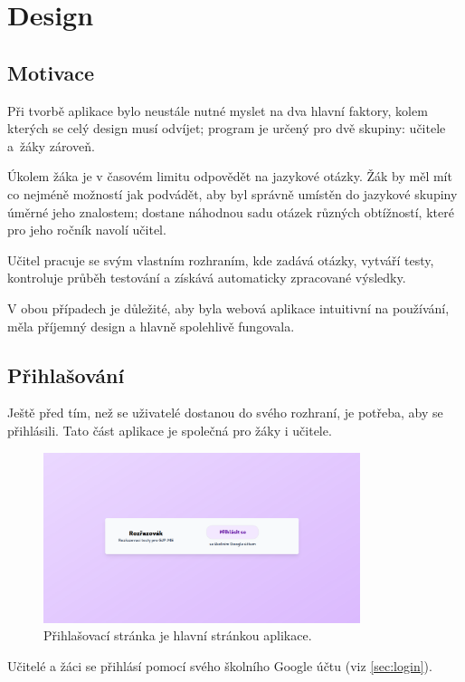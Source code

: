 \hypertarget{Design}{\chapter{Design}}

\section{Motivace}

Při tvorbě aplikace bylo neustále nutné myslet na dva hlavní faktory, kolem kterých se celý design musí odvíjet; program je určený pro dvě skupiny: učitele a~žáky zároveň. 

Úkolem žáka je v časovém limitu odpovědět na jazykové otázky. Žák by měl mít co nejméně možností jak podvádět, aby byl správně umístěn do jazykové skupiny úměrné jeho znalostem; dostane náhodnou sadu otázek různých obtížností, které pro jeho ročník navolí učitel.

Učitel pracuje se svým vlastním rozhraním, kde zadává otázky, vytváří testy, \mbox{kontroluje} průběh testování a získává automaticky zpracované výsledky.

V obou případech je důležité, aby byla webová aplikace intuitivní na používání, měla příjemný design a hlavně spolehlivě fungovala.

\section{Přihlašování}
\label{sec:login-design}

Ještě před tím, než se uživatelé dostanou do svého rozhraní, je potřeba, aby se přihlásili. Tato část aplikace je společná pro žáky i učitele. 

\begin{figure}[H]
    \centering
    \includegraphics[width=350px]{images/01design/login.png}
    \caption{Přihlašovací stránka je hlavní stránkou aplikace.}
\end{figure}

Učitelé a žáci se přihlásí pomocí svého školního Google účtu (viz \ref{sec:login}).

